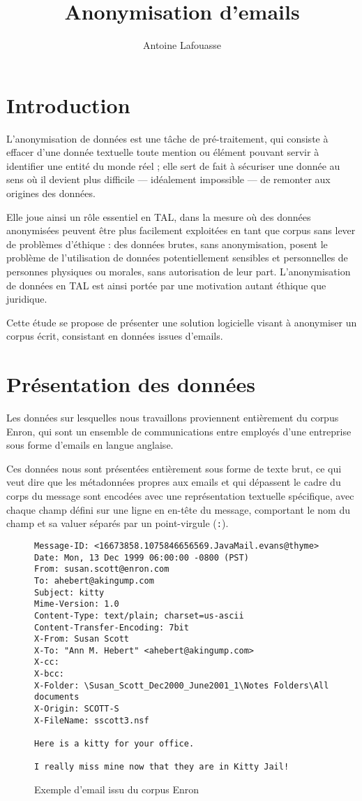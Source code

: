 \documentclass[11pt]{article}
\title{Anonymisation d'emails}
\author{Antoine Lafouasse}
\begin{document}
\maketitle

\section*{Introduction}

L'anonymisation de données est une tâche de pré-traitement, qui consiste à
effacer d'une donnée textuelle toute mention ou élément pouvant servir à
identifier une entité du monde réel ; elle sert de fait à sécuriser une donnée
au sens où il devient plus difficile --- idéalement impossible --- de remonter
aux origines des données.

Elle joue ainsi un rôle essentiel en TAL, dans la mesure où des données
anonymisées peuvent être plus facilement exploitées en tant que corpus sans
lever de problèmes d'éthique : des données brutes, sans anonymisation, posent
le problème de l'utilisation de données potentiellement sensibles et
personnelles de personnes physiques ou morales, sans autorisation de leur part.
L'anonymisation de données en TAL est ainsi portée par une motivation autant
éthique que juridique.

Cette étude se propose de présenter une solution logicielle visant à anonymiser
un corpus écrit, consistant en données issues d'emails.

\section{Présentation des données}

Les données sur lesquelles nous travaillons proviennent entièrement du corpus
Enron, qui sont un ensemble de communications entre employés d'une entreprise
sous forme d'emails en langue anglaise.

Ces données nous sont présentées entièrement sous forme de texte brut, ce qui
veut dire que les métadonnées propres aux emails et qui dépassent le cadre du
corps du message sont encodées avec une représentation textuelle spécifique,
avec chaque champ défini sur une ligne en en-tête du message, comportant le
nom du champ et sa valuer séparés par un point-virgule (\texttt{:}).

\begin{figure}[H]
\begin{verbatim}
Message-ID: <16673858.1075846656569.JavaMail.evans@thyme>
Date: Mon, 13 Dec 1999 06:00:00 -0800 (PST)
From: susan.scott@enron.com
To: ahebert@akingump.com
Subject: kitty
Mime-Version: 1.0
Content-Type: text/plain; charset=us-ascii
Content-Transfer-Encoding: 7bit
X-From: Susan Scott
X-To: "Ann M. Hebert" <ahebert@akingump.com>
X-cc:
X-bcc:
X-Folder: \Susan_Scott_Dec2000_June2001_1\Notes Folders\All documents
X-Origin: SCOTT-S
X-FileName: sscott3.nsf

Here is a kitty for your office.

I really miss mine now that they are in Kitty Jail!
\end{verbatim}
\caption{Exemple d'email issu du corpus Enron}
\label{fig:emailex}
\end{figure}
\end{document}
